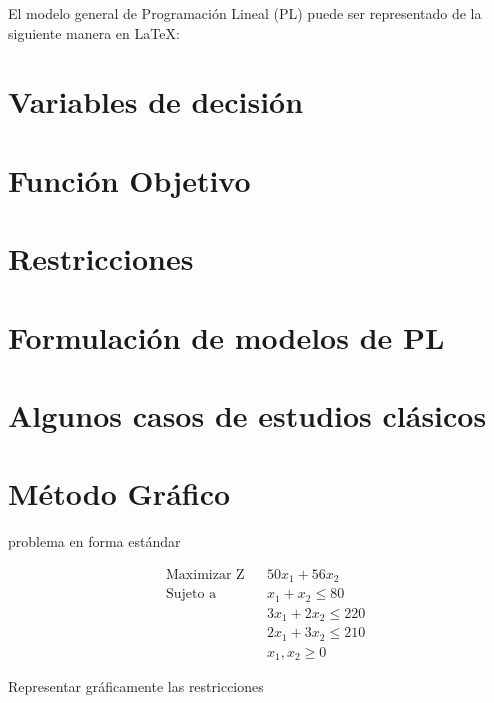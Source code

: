 \documentclass[
  letterpaper,
  DIV=11,
  numbers=noendperiod]{scrreprt}
\theoremstyle{definition}
\theoremstyle{definition}
\theoremstyle{remark}
\begin{document}
El modelo general de Programación Lineal (PL) puede ser representado de
la siguiente manera en LaTeX:

\hypertarget{variables-de-decisiuxf3n}{%
\section{Variables de decisión}\label{variables-de-decisiuxf3n}}

\hypertarget{funciuxf3n-objetivo}{%
\section{Función Objetivo}\label{funciuxf3n-objetivo}}

\hypertarget{restricciones}{%
\section{Restricciones}\label{restricciones}}

\hypertarget{formulaciuxf3n-de-modelos-de-pl}{%
\section{Formulación de modelos de
PL}\label{formulaciuxf3n-de-modelos-de-pl}}

\hypertarget{algunos-casos-de-estudios-cluxe1sicos}{%
\section{Algunos casos de estudios
clásicos}\label{algunos-casos-de-estudios-cluxe1sicos}}

\hypertarget{muxe9todo-gruxe1fico}{%
\section{Método Gráfico}\label{muxe9todo-gruxe1fico}}

problema en forma estándar

\begin{align}
& \text{Maximizar Z} & & 50x_1 + 56x_2 \\
& \text{Sujeto a}    & & x_1 + x_2 \leq 80 \\
&                    & & 3x_1 + 2x_2 \leq 220 \\
&                    & & 2x_1 + 3x_2 \leq 210 \\
&                    & & x_1, x_2 \geq 0
\end{align}

Representar gráficamente las restricciones
\end{document}
